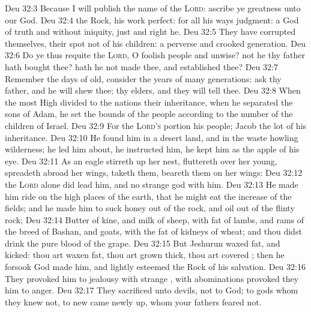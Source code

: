 \vs Deu 32:3 Because I will publish the name of the \textsc{Lord}: ascribe ye greatness unto our God.
\vs Deu 32:4  the Rock, his work  perfect: for all his ways  judgment: a God of truth and without iniquity, just and right  he.
\vs Deu 32:5 They have corrupted themselves, their spot  not  of his children:  a perverse and crooked generation.
\vs Deu 32:6 Do ye thus requite the \textsc{Lord}, O foolish people and unwise?  not he thy father  hath bought thee? hath he not made thee, and established thee?
\vs Deu 32:7 Remember the days of old, consider the years of many generations: ask thy father, and he will shew thee; thy elders, and they will tell thee.
\vs Deu 32:8 When the most High divided to the nations their inheritance, when he separated the sons of Adam, he set the bounds of the people according to the number of the children of Israel.
\vs Deu 32:9 For the \textsc{Lord's} portion  his people; Jacob  the lot of his inheritance.
\vs Deu 32:10 He found him in a desert land, and in the waste howling wilderness; he led him about, he instructed him, he kept him as the apple of his eye.
\vs Deu 32:11 As an eagle stirreth up her nest, fluttereth over her young, spreadeth abroad her wings, taketh them, beareth them on her wings:
\vs Deu 32:12  the \textsc{Lord} alone did lead him, and  no strange god with him.
\vs Deu 32:13 He made him ride on the high places of the earth, that he might eat the increase of the fields; and he made him to suck honey out of the rock, and oil out of the flinty rock;
\vs Deu 32:14 Butter of kine, and milk of sheep, with fat of lambs, and rams of the breed of Bashan, and goats, with the fat of kidneys of wheat; and thou didst drink the pure blood of the grape.
\vs Deu 32:15 But Jeshurun waxed fat, and kicked: thou art waxen fat, thou art grown thick, thou art covered ; then he forsook God  made him, and lightly esteemed the Rock of his salvation.
\vs Deu 32:16 They provoked him to jealousy with strange , with abominations provoked they him to anger.
\vs Deu 32:17 They sacrificed unto devils, not to God; to gods whom they knew not, to new  came newly up, whom your fathers feared not.
